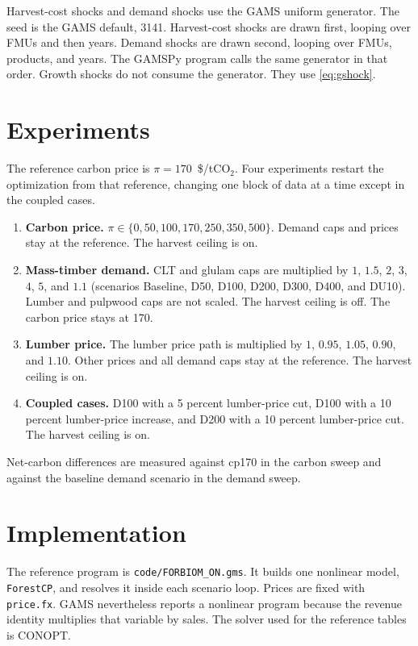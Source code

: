 \documentclass[11pt]{article}
\begin{document}
Harvest-cost shocks and demand shocks use the GAMS uniform generator. The seed is the GAMS default, 3141. Harvest-cost shocks are drawn first, looping over FMUs and then years. Demand shocks are drawn second, looping over FMUs, products, and years. The GAMSPy program calls the same generator in that order. Growth shocks do not consume the generator. They use \eqref{eq:gshock}.

\section{Experiments}

The reference carbon price is $\pi = 170$~\$/tCO$_2$. Four experiments restart the optimization from that reference, changing one block of data at a time except in the coupled cases.

\begin{enumerate}
\item \textbf{Carbon price.} $\pi \in \{0, 50, 100, 170, 250, 350, 500\}$. Demand caps and prices stay at the reference. The harvest ceiling is on.
\item \textbf{Mass-timber demand.} CLT and glulam caps are multiplied by $1$, $1.5$, $2$, $3$, $4$, $5$, and $1.1$ (scenarios Baseline, D50, D100, D200, D300, D400, and DU10). Lumber and pulpwood caps are not scaled. The harvest ceiling is off. The carbon price stays at 170.
\item \textbf{Lumber price.} The lumber price path is multiplied by $1$, $0.95$, $1.05$, $0.90$, and $1.10$. Other prices and all demand caps stay at the reference. The harvest ceiling is on.
\item \textbf{Coupled cases.} D100 with a 5 percent lumber-price cut, D100 with a 10 percent lumber-price increase, and D200 with a 10 percent lumber-price cut. The harvest ceiling is on.
\end{enumerate}

Net-carbon differences are measured against cp170 in the carbon sweep and against the baseline demand scenario in the demand sweep.

\section{Implementation}

The reference program is \texttt{code/FORBIOM\_ON.gms}. It builds one nonlinear model, \texttt{ForestCP}, and resolves it inside each scenario loop. Prices are fixed with \texttt{price.fx}. GAMS nevertheless reports a nonlinear program because the revenue identity multiplies that variable by sales. The solver used for the reference tables is CONOPT.
\end{document}
